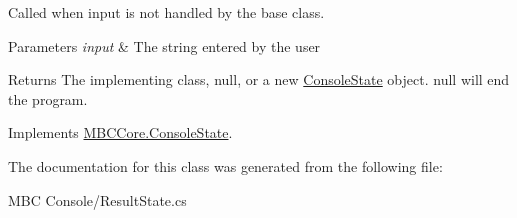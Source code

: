 Called when input is not handled by the base class.


\begin{DoxyParams}{Parameters}
{\em input} & The string entered by the user\\
\hline
\end{DoxyParams}
\begin{DoxyReturn}{Returns}
The implementing class, null, or a new \hyperlink{class_m_b_c_core_1_1_console_state}{Console\-State} object. null will end the program.
\end{DoxyReturn}


Implements \hyperlink{class_m_b_c_core_1_1_console_state_a6eeffce4b7e3c7683bcc27e1baa2131b}{M\-B\-C\-Core.\-Console\-State}.



The documentation for this class was generated from the following file\-:\begin{DoxyCompactItemize}
\item 
M\-B\-C Console/Result\-State.\-cs\end{DoxyCompactItemize}
